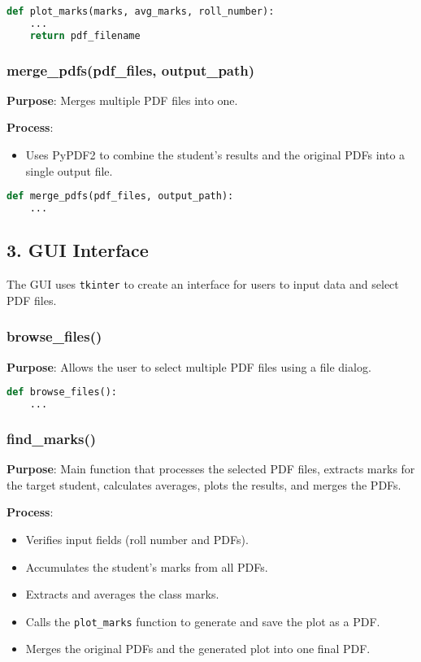 \documentclass{article}
\begin{document}
\begin{lstlisting}[language=Python, caption=Function to Plot Marks and Averages]
def plot_marks(marks, avg_marks, roll_number):
    ...
    return pdf_filename
\end{lstlisting}

\subsubsection{merge\_pdfs(pdf\_files, output\_path)}
\textbf{Purpose}: Merges multiple PDF files into one.

\textbf{Process}:
\begin{itemize}
    \item Uses PyPDF2 to combine the student’s results and the original PDFs into a single output file.
\end{itemize}

\begin{lstlisting}[language=Python, caption=Function to Merge PDFs]
def merge_pdfs(pdf_files, output_path):
    ...
\end{lstlisting}

\subsection{3. GUI Interface}

The GUI uses \texttt{tkinter} to create an interface for users to input data and select PDF files.

\subsubsection{browse\_files()}
\textbf{Purpose}: Allows the user to select multiple PDF files using a file dialog.

\begin{lstlisting}[language=Python, caption=File Browser]
def browse_files():
    ...
\end{lstlisting}

\subsubsection{find\_marks()}
\textbf{Purpose}: Main function that processes the selected PDF files, extracts marks for the target student, calculates averages, plots the results, and merges the PDFs.

\textbf{Process}:
\begin{itemize}
    \item Verifies input fields (roll number and PDFs).
    \item Accumulates the student's marks from all PDFs.
    \item Extracts and averages the class marks.
    \item Calls the \texttt{plot\_marks} function to generate and save the plot as a PDF.
    \item Merges the original PDFs and the generated plot into one final PDF.
\end{itemize}
\end{document}
